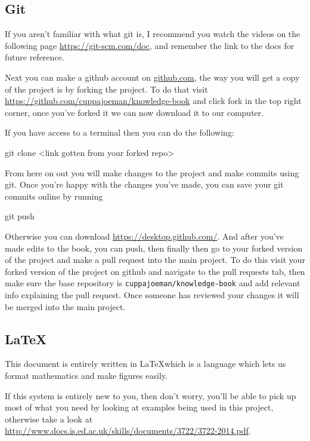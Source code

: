 \subsection*{Git}
If you aren't familiar with what git is, I recommend you watch the videos on the following page \url{https://git-scm.com/doc}, and remember the link to the docs for future reference. 

Next you can make a github account on \url{github.com}, the way you will get a copy of the project is by forking the project. To do that visit \url{https://github.com/cuppajoeman/knowledge-book} and click fork in the top right corner, once you've forked it we can now download it to our computer.

If you have access to a terminal then you can do the following:

\begin{term}
git clone <link gotten from your forked repo>
\end{term}

From here on out you will make changes to the project and make commits using git. Once you're happy with the changes you've made, you can save your git commits online by running

\begin{term}
git push
\end{term}

Otherwise you can download \url{https://desktop.github.com/}. And after you've made edits to the book, you can push, then finally then go to your forked version of the project and make a pull request into the main project. To do this visit your forked version of the project on github and navigate to the pull requests tab, then make sure the base repository is \texttt{cuppajoeman/knowledge-book} and add relevant info explaining the pull request. Once someone has reviewed your changes it will be merged into the main project.

\subsection*{\LaTeX}

This document is entirely written in \LaTeX which is a language which lets us format mathematics and make figures easily.

If this system is entirely new to you, then don't worry, you'll be able to pick up most of what you need by looking at examples being used in this project, otherwise take a look at \url{http://www.docs.is.ed.ac.uk/skills/documents/3722/3722-2014.pdf}.

